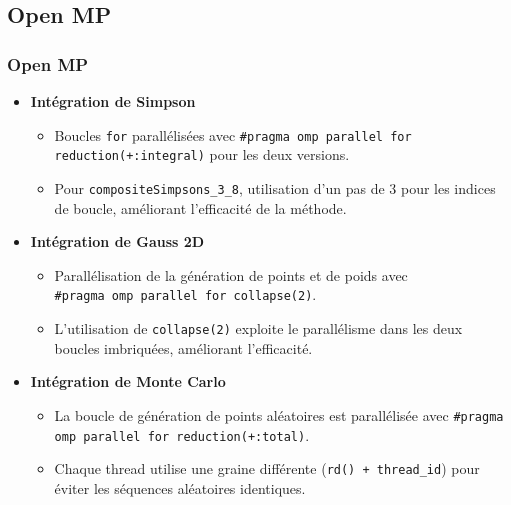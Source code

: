 \documentclass[10pt]{beamer}
\begin{document}
\subsection{Open MP}
\begin{frame}
    \frametitle{Open MP}
    \small
    \begin{itemize}
        \item \textbf{Intégration de Simpson}
            \begin{itemize}
                \item Boucles \texttt{for} parallélisées avec \texttt{\#pragma omp parallel for reduction(+:integral)} pour les deux versions.
                \item Pour \texttt{compositeSimpsons\_3\_8}, utilisation d'un pas de 3 pour les indices de boucle, améliorant l'efficacité de la méthode.
            \end{itemize}
        \item \textbf{Intégration de Gauss 2D }
            \begin{itemize}
                \item Parallélisation de la génération de points et de poids avec \\\texttt{\#pragma omp parallel for collapse(2)}.
                \item L'utilisation de \texttt{collapse(2)} exploite le parallélisme dans les deux boucles imbriquées, améliorant l'efficacité.
            \end{itemize}
        \item \textbf{Intégration de Monte Carlo }
            \begin{itemize}
                \item La boucle de génération de points aléatoires est parallélisée avec \texttt{\#pragma omp parallel for reduction(+:total)}.
                \item Chaque thread utilise une graine différente (\texttt{rd() + thread\_id}) pour éviter les séquences aléatoires identiques.
            \end{itemize}
    \end{itemize}
\end{frame}
\end{document}
